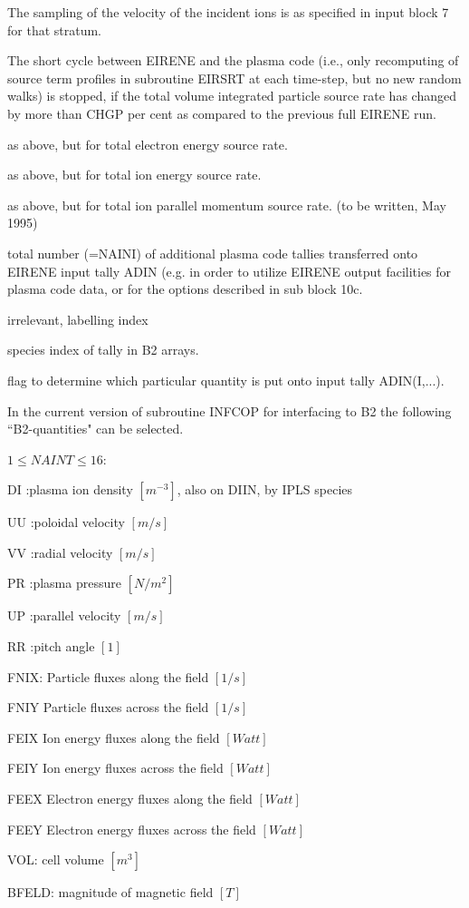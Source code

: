 The sampling of the velocity of the incident ions
is as specified in input block 7 for that stratum.
\begin{list}{ }{}
\item[{\bf CHGP }]
The short cycle between EIRENE and the plasma code (i.e., only
recomputing of source term profiles in subroutine EIRSRT at each
time-step, but no new random walks) is stopped, if the total volume
integrated particle source rate has changed by more than CHGP per cent
as compared to the previous full EIRENE run.
\item[{\bf CHGEE }]
as above, but for total electron energy source rate.
\item[{\bf CHGEI }]
as above, but for total ion energy source rate.
\item[{\bf CHGMOM }]
as above, but for total ion parallel momentum source rate.
(to be written, May 1995)
\item[{\bf NAINB }]
total number (=NAINI) of additional plasma code tallies
transferred
onto EIRENE input tally ADIN (e.g. in order to utilize EIRENE output
facilities for plasma code data, or for the options described in sub
block 10c.
\item[{\bf I }]
irrelevant, labelling index
\item[{\bf NAINS }]
species index of tally in B2 arrays.
\item[{\bf NAINT }]
flag to determine which particular quantity is put onto input tally
ADIN(I,...).

In the current version of subroutine INFCOP for interfacing to B2
the following ``B2-quantities" can be selected.

$1 \le NAINT \le 16 :$
\begin{list}{ }{}
\item[{= 1 }] DI :plasma ion density $[m^{-3}]$, also on DIIN, by IPLS species
\item[{= 2 }] UU :poloidal velocity $[m/s]$
\item[{= 3 }] VV :radial velocity $[m/s]$
\item[{= 6 }] PR :plasma pressure $[N/m^2]$
\item[{= 7 }] UP :parallel velocity $[m/s]$
\item[{= 8 }] RR :pitch angle $[1]$
\item[{= 9 }] FNIX: Particle fluxes along the field $[1/s]$
\item[{= 10 }] FNIY Particle fluxes across the field $[1/s]$
\item[{= 11 }] FEIX Ion energy fluxes along the field $[Watt]$
\item[{= 12 }] FEIY Ion energy fluxes across the field $[Watt]$
\item[{= 13 }] FEEX Electron energy fluxes along the field $[Watt]$
\item[{= 14 }] FEEY Electron energy fluxes across the field $[Watt]$
\item[{= 15 }] VOL: cell volume $[m^3]$
\item[{= 16 }] BFELD: magnitude of magnetic field $[T]$
\end{list}


\end{list}
